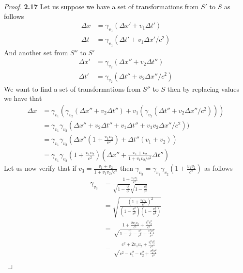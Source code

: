 \documentclass[11pt]{article}
\theoremstyle{definition}
\begin{document}
	\begin{proof}{\textbf{2.17}}
        Let us suppose we have a set of transformations from $S'$ to $S$ as follows
        \begin{align*}
            \Delta x &= \gamma_{v_1} (\Delta x' + v_1\Delta t')\\
            \Delta t &= \gamma_{v_1} (\Delta t' + v_1\Delta x'/c^2)
        \end{align*}
        And another set from $S''$ to $S'$
        \begin{align*}
            \Delta x' &= \gamma_{v_2} (\Delta x'' + v_2\Delta t'')\\
            \Delta t' &= \gamma_{v_2} (\Delta t'' + v_2\Delta x''/c^2)
        \end{align*}
        We want to find a set of transformations from $S''$ to $S$ then by replacing
        values we have that
        \begin{align*}
            \Delta x &= \gamma_{v_1} (\gamma_{v_2} (\Delta x'' + v_2\Delta t'')
                + v_1(\gamma_{v_2} (\Delta t'' + v_2\Delta x''/c^2)))\\
                &= \gamma_{v_1} \gamma_{v_2}(\Delta x'' + v_2\Delta t''
                + v_1\Delta t'' + v_1v_2\Delta x''/c^2))\\
                &= \gamma_{v_1} \gamma_{v_2}(\Delta x''(1 + \frac{v_1v_2}{c^2}) + 
                \Delta t'' (v_1 + v_2))\\
                &= \gamma_{v_1} \gamma_{v_2}(1 + \frac{v_1v_2}{c^2})(\Delta x''
                + \frac{v_1 + v_2}{1 + v_1v_2/c^2}\Delta t'')
        \end{align*}
        Let us now verify that if $v_3 = \frac{v_1 + v_2}{1 + v_1v_2/c^2}$ then 
        $\gamma_{v_3} = \gamma_{v_1} \gamma_{v_2}(1 + \frac{v_1v_2}{c^2})$ as follows
        \begin{align*}
            \gamma_{v_3} &= \frac{1 + \frac{v_1v_2}{c^2}}{
                \sqrt{1-\frac{v_1^2}{c^2}}\sqrt{1-\frac{v_2^2}{c^2}}}\\
                &= \sqrt{\frac{(1 + \frac{v_1v_2}{c^2})^2}{
                (1-\frac{v_1^2}{c^2})(1-\frac{v_2^2}{c^2})}}\\
                &= \sqrt\frac{1 + \frac{2v_1v_2}{c^2} + \frac{v_1^2v_2^2}{c^4}}{
                1 - \frac{v_1^2}{c^2} - \frac{v_2^2}{c^2} + \frac{v_2^2v_1^2}{c^4}}\\
                &= \sqrt\frac{c^2 + 2v_1v_2 + \frac{v_1^2v_2^2}{c^2}}{
                c^2 - v_1^2 - v_2^2 + \frac{v_2^2v_1^2}{c^2}}\\

\end{align*}
\end{proof}
\end{document}
